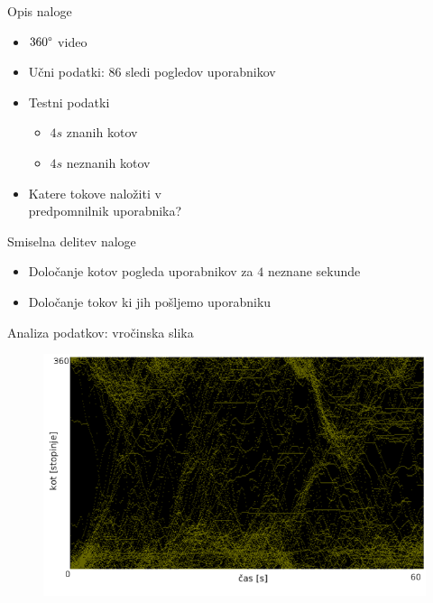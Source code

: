 \begin{frame}{Opis naloge}
  \vspace{-60pt}
  \begin{itemize}
    \item $360\degree$ video
    \item Učni podatki: 86 sledi pogledov uporabnikov
    \item Testni podatki
    \begin{itemize}
      \item $4s$ znanih kotov
      \item $4s$ neznanih kotov
    \end{itemize}
    \item Katere tokove naložiti v \\ predpomnilnik uporabnika?
  \end{itemize}
\end{frame}

\begin{frame}{Smiselna delitev naloge}
  \begin{itemize}
    \item Določanje kotov pogleda uporabnikov za $4$ neznane sekunde
    \item Določanje tokov ki jih pošljemo uporabniku
  \end{itemize}
\end{frame}

\begin{frame}{Analiza podatkov: vročinska slika}
  \begin{figure}
    \includegraphics[scale=0.67]{img/hm-kd.png}
  \end{figure}
\end{frame}

